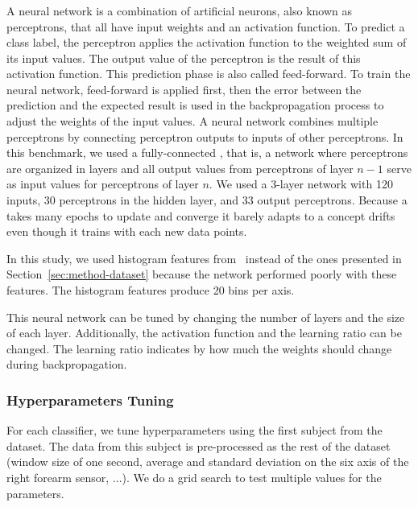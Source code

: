 \subsubsection{\FNN}
A neural network is a combination of artificial
neurons, also known as perceptrons, that all have input weights and an
activation function. To predict a class label, the
perceptron applies the activation function to the weighted sum
of its input values. The output
value of the perceptron is the result of this
activation function. This prediction phase is also
called feed-forward. To train the neural network,
feed-forward is applied first, then the error between the
prediction and the expected result is used in the
backpropagation process to adjust the weights of
the input values.  A neural network combines
multiple perceptrons by connecting perceptron outputs
to inputs of other perceptrons.  In
this benchmark, we used a fully-connected \FNN, 
that is, a network where perceptrons are organized in
layers and all output
values from perceptrons of layer $n-1$ serve as
input values for perceptrons of layer $n$. 
We used a 3-layer network with 120 inputs, 30
perceptrons in the hidden layer, and 33 output
perceptrons.
Because a \FNN takes many epochs to update and
converge it barely adapts to a concept drifts even
though it trains with each new data points.

In this study, we used histogram features
from~\cite{omid_2019} instead of the ones
presented in Section~\ref{sec:method-dataset}
because the network performed
poorly with these features. The histogram features
produce 20 bins per axis.

This neural network can be tuned by changing the
number of layers and the size of each layer.
Additionally, the activation function and the
learning ratio can be changed. The learning ratio
indicates by how much the weights should change
during backpropagation.

\subsubsection{Hyperparameters Tuning}
For each classifier, we tune hyperparameters  using the first
subject from the \banosdataset dataset.  The data from
this subject is pre-processed as the rest of
the \banosdataset dataset (window size of one second,
average and standard deviation on the six
axis of the right forearm sensor,
$\ldots$). We do a grid search to test multiple values for the
parameters.

